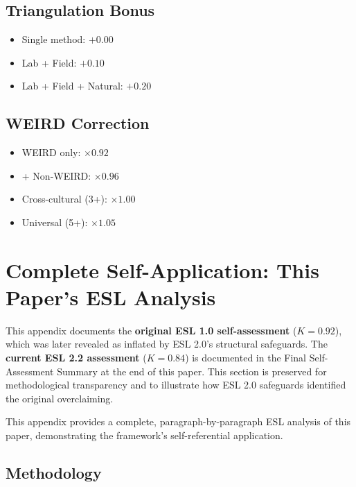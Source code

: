 \documentclass[11pt,a4paper]{article}
\begin{document}
\subsection{Triangulation Bonus}
\begin{itemize}
    \item Single method: $+0.00$
    \item Lab + Field: $+0.10$
    \item Lab + Field + Natural: $+0.20$
\end{itemize}

\subsection{WEIRD Correction}
\begin{itemize}
    \item WEIRD only: $\times 0.92$
    \item + Non-WEIRD: $\times 0.96$
    \item Cross-cultural (3+): $\times 1.00$
    \item Universal (5+): $\times 1.05$
\end{itemize}


\section{Complete Self-Application: This Paper's ESL Analysis}
\label{app:self-application}

\begin{warningbox}[title={Historical Context: ESL 1.0 Analysis}]
This appendix documents the \textbf{original ESL 1.0 self-assessment} ($K = 0.92$), which was later revealed as inflated by ESL 2.0's structural safeguards. The \textbf{current ESL 2.2 assessment} ($K = 0.84$) is documented in the Final Self-Assessment Summary at the end of this paper. This section is preserved for methodological transparency and to illustrate how ESL 2.0 safeguards identified the original overclaiming.
\end{warningbox}

This appendix provides a complete, paragraph-by-paragraph ESL analysis of this paper, demonstrating the framework's self-referential application.

\subsection{Methodology}
\end{document}
